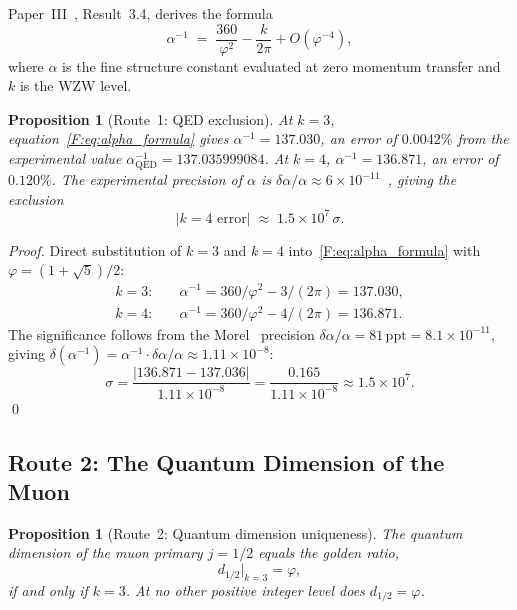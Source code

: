 \documentclass[11pt,a4paper]{article}
\newtheorem{proposition}[theorem]{Proposition}
\theoremstyle{definition}
\theoremstyle{remark}
\newcommand{\vp}{\varphi}
\begin{document}
Paper~III~\cite{Paper3}, Result~3.4,%
derives the formula
\begin{equation}
  \alpha^{-1}
  \;=\; \frac{360}{\vp^2} - \frac{k}{2\pi} + O(\vp^{-4}),
  \label{F:eq:alpha_formula}
\end{equation}
where $\alpha$ is the fine structure constant evaluated at zero momentum
transfer and $k$ is the WZW level.

\begin{proposition}[Route~1: QED exclusion]
\label{F:prop:route1}
At $k=3$, equation~\eqref{F:eq:alpha_formula} gives
$\alpha^{-1} = 137.030$, an error of $0.0042\%$ from the experimental
value $\alpha^{-1}_{\mathrm{QED}} = 137.035999084$.
At $k=4$, $\alpha^{-1} = 136.871$, an error of $0.120\%$.
The experimental precision of $\alpha$ is $\delta\alpha/\alpha
\approx 6\times10^{-11}$~\cite{Morel2020}, giving the exclusion
\begin{equation}
  |k=4 \text{ error}| \;\approx\; 1.5\times10^7\,\sigma.
  \label{F:eq:sigma_exclusion}
\end{equation}
\end{proposition}

\begin{proof}
Direct substitution of $k=3$ and $k=4$ into~\eqref{F:eq:alpha_formula}
with $\vp=(1+\sqrt{5})/2$:
\begin{align*}
  k=3: &\quad \alpha^{-1} = 360/\vp^2 - 3/(2\pi) = 137.030, \\
  k=4: &\quad \alpha^{-1} = 360/\vp^2 - 4/(2\pi) = 136.871.
\end{align*}
The significance follows from the Morel~\cite{Morel2020} precision
$\delta\alpha/\alpha = 81\,\mathrm{ppt} = 8.1\times10^{-11}$,
giving $\delta(\alpha^{-1}) = \alpha^{-1}\cdot\delta\alpha/\alpha
\approx 1.11\times10^{-8}$:
\begin{equation*}
  \sigma = \frac{|136.871 - 137.036|}{1.11\times10^{-8}}
  = \frac{0.165}{1.11\times10^{-8}}
  \approx 1.5\times10^7.
\end{equation*}
\qed
\end{proof}

\subsection{Route 2: The Quantum Dimension of the Muon}
\label{F:sec:route2}

\begin{proposition}[Route~2: Quantum dimension uniqueness]
\label{F:prop:route2}
The quantum dimension of the muon primary $j=1/2$ equals the golden ratio,
\begin{equation}
  d_{1/2}\big|_{k=3} = \vp,
  \label{F:eq:qdim_phi}
\end{equation}
if and only if $k=3$.
At no other positive integer level does $d_{1/2} = \vp$.
\end{proposition}
\end{document}
